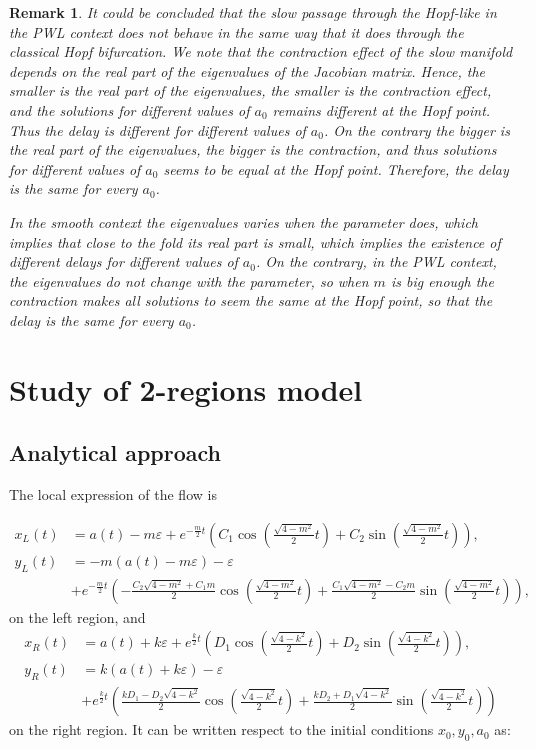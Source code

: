 \documentclass[a4paper,preprint,11pt]{article}
\newtheorem{remark}[theorem]{Remark}
\begin{document}
\begin{remark} It could be concluded that the slow passage through the Hopf-like in the PWL context does not behave in the same way that it does through the classical Hopf bifurcation. We note that the contraction effect of the slow manifold depends on the real part of the eigenvalues of the Jacobian matrix. Hence, the smaller is the real part of the eigenvalues, the smaller is the contraction effect, and the solutions for different values of $a_0$ remains different at the Hopf point. Thus the delay is different for different values of $a_0$. On the contrary the bigger is the real part of the eigenvalues, the  bigger is the contraction, and thus solutions for different values of $a_0$ seems to be equal at the Hopf point. Therefore, the delay is the same for every  $a_0$. 

In the smooth context the eigenvalues varies when the parameter does, which implies that close to the fold its real part is small, which implies the existence of different delays for different values of $a_0$. On the contrary, in the PWL context, the eigenvalues do not change with the parameter, so when $m$ is big enough the contraction makes all solutions to seem the same at the Hopf point, so that the delay is the same for every $a_0$.
\end{remark}



\section{Study of 2-regions model}

\subsection{Analytical approach}

The local expression of the flow is

\begin{align*}
x_L(t)&=a(t)-m\varepsilon+
  e^{-\frac {m}{2}t} \left(
      C_1 \cos\left(\frac {\sqrt{4-m^2}}2t \right)+
      C_2 \sin\left(\frac {\sqrt{4-m^2}}2t \right)
    \right),\\
y_L(t)&=-m(a(t)-m\varepsilon)-\varepsilon\\
  &+e^{-\frac {m}{2}t} \left(
      -\frac{C_2\sqrt{4-m^2}+C_1m}2 \cos\left(\frac {\sqrt{4-m^2}}2t \right)
      +\frac{C_1\sqrt{4-m^2}-C_2 m}2 \sin\left(\frac {\sqrt{4-m^2}}2t \right)
    \right),
\end{align*}
on the left region, and 
\begin{align*}
x_R(t)&=a(t)+k\varepsilon+
  e^{\frac {k}{2}t} \left(
      D_1 \cos\left(\frac {\sqrt{4-k^2}}2t \right)+
      D_2 \sin\left(\frac {\sqrt{4-k^2}}2t \right)
    \right),\\
y_R(t)&=k(a(t)+k\varepsilon)-\varepsilon\\
  &+e^{\frac {k}{2}t} \left(
      \frac{kD_1-D_2\sqrt{4-k^2}}2 \cos\left(\frac {\sqrt{4-k^2}}2t \right)
      +\frac{kD_2+D_1\sqrt{4-k^2}}2 \sin\left(\frac {\sqrt{4-k^2}}2t \right)
    \right)
\end{align*}
on the right region. It can be written respect to the initial conditions $x_0,y_0,a_0$ as:
\end{document}
